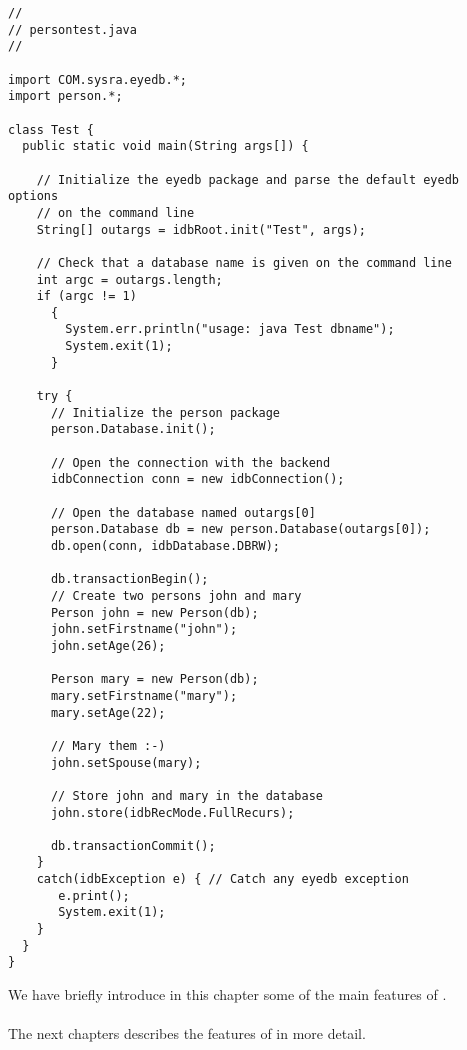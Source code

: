\verbsize \begin{verbatim}
//
// persontest.java
//

import COM.sysra.eyedb.*;
import person.*;

class Test {
  public static void main(String args[]) {

    // Initialize the eyedb package and parse the default eyedb options
    // on the command line
    String[] outargs = idbRoot.init("Test", args);
     
    // Check that a database name is given on the command line
    int argc = outargs.length;
    if (argc != 1)
      {
        System.err.println("usage: java Test dbname");
        System.exit(1);
      }

    try {
      // Initialize the person package
      person.Database.init();

      // Open the connection with the backend
      idbConnection conn = new idbConnection();

      // Open the database named outargs[0]
      person.Database db = new person.Database(outargs[0]);
      db.open(conn, idbDatabase.DBRW);

      db.transactionBegin();
      // Create two persons john and mary
      Person john = new Person(db);
      john.setFirstname("john");
      john.setAge(26);
     
      Person mary = new Person(db);
      mary.setFirstname("mary");
      mary.setAge(22);
     
      // Mary them :-)
      john.setSpouse(mary);

      // Store john and mary in the database
      john.store(idbRecMode.FullRecurs);

      db.transactionCommit();
    }
    catch(idbException e) { // Catch any eyedb exception
       e.print();
       System.exit(1);
    }
  }
}
\end{verbatim}
\normalsize

We have briefly introduce in this chapter some of the main features
of \eyedbX.
\\
\\
The next chapters describes the features of \eyedb in more detail.





